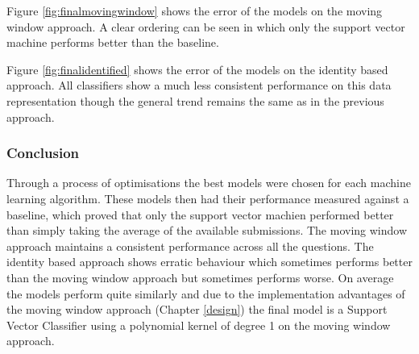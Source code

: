 Figure \ref{fig:finalmovingwindow} shows the error of the models on the moving window approach. A clear ordering can be seen in which only the support vector machine performs better than the baseline. 

Figure \ref{fig:finalidentified} shows the error of the models on the identity based approach. All classifiers show a much less consistent performance on this data representation though the general trend remains the same as in the previous approach. 

\subsubsection{Conclusion}
Through a process of optimisations the best models were chosen for each machine learning algorithm. These models then had their performance measured against a baseline, which proved that only the support vector machien performed better than simply taking the average of the available submissions. The moving window approach maintains a consistent performance across all the questions. The identity based approach shows erratic behaviour which sometimes performs better than the moving window approach but sometimes performs worse. On average the models perform quite similarly and due to the implementation advantages of the moving window approach (Chapter \ref{design}) the final model is a Support Vector Classifier using a polynomial kernel of degree 1 on the moving window approach.
